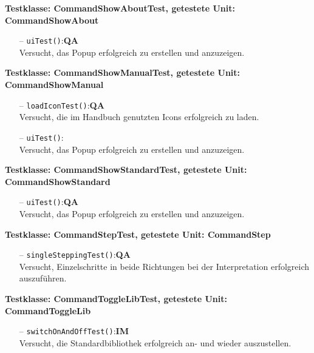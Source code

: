 \documentclass[parskip=full,11pt,twoside]{scrartcl}
\def\qa{\hfill\textbf{QA}}
\def\impl{\hfill\textbf{IM}}
\begin{document}
\textbf{Testklasse: CommandShowAboutTest, getestete Unit: CommandShowAbout}
\begin{itemize}
	\item[--] \texttt{uiTest()}:\qa\\
	Versucht, das Popup erfolgreich zu erstellen und anzuzeigen.
\end{itemize}

\textbf{Testklasse: CommandShowManualTest, getestete Unit: CommandShowManual}
\begin{itemize}
	\item[--] \texttt{loadIconTest()}:\qa\\
	Versucht, die im Handbuch genutzten Icons erfolgreich zu laden.
	\item[--] \texttt{uiTest()}:\\
	Versucht, das Popup erfolgreich zu erstellen und anzuzeigen.
\end{itemize}

\textbf{Testklasse: CommandShowStandardTest, getestete Unit: CommandShowStandard}
\begin{itemize}
	\item[--] \texttt{uiTest()}:\qa\\
	Versucht, das Popup erfolgreich zu erstellen und anzuzeigen.
\end{itemize}

\textbf{Testklasse: CommandStepTest, getestete Unit: CommandStep}
\begin{itemize}
	\item[--] \texttt{singleSteppingTest()}:\qa\\
	Versucht, Einzelschritte in beide Richtungen bei der Interpretation erfolgreich auszuführen.
\end{itemize}

\textbf{Testklasse: CommandToggleLibTest, getestete Unit: CommandToggleLib}
\begin{itemize}
	\item[--] \texttt{switchOnAndOffTest()}:\impl\\
	Versucht, die Standardbibliothek erfolgreich an- und wieder auszustellen.
\end{itemize}
\end{document}
